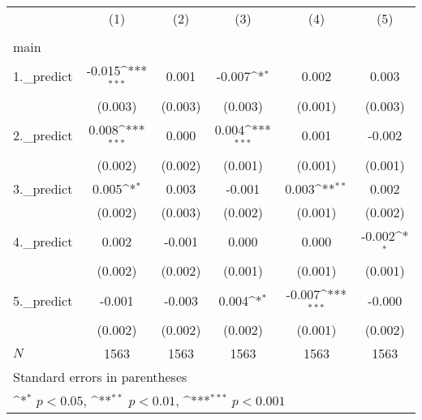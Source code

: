 {
\def\sym#1{\ifmmode^{#1}\else\(^{#1}\)\fi}
\begin{tabular}{l*{5}{c}}
\hline\hline
            &\multicolumn{1}{c}{(1)}&\multicolumn{1}{c}{(2)}&\multicolumn{1}{c}{(3)}&\multicolumn{1}{c}{(4)}&\multicolumn{1}{c}{(5)}\\
            &\multicolumn{1}{c}{} &\multicolumn{1}{c}{} &\multicolumn{1}{c}{} &\multicolumn{1}{c}{} &\multicolumn{1}{c}{} \\
\hline
main        &                     &                     &                     &                     &                     \\
1.\_predict  &      -0.015\sym{***}&       0.001         &      -0.007\sym{*}  &       0.002         &       0.003         \\
            &     (0.003)         &     (0.003)         &     (0.003)         &     (0.001)         &     (0.003)         \\
[1em]
2.\_predict  &       0.008\sym{***}&       0.000         &       0.004\sym{***}&       0.001         &      -0.002         \\
            &     (0.002)         &     (0.002)         &     (0.001)         &     (0.001)         &     (0.001)         \\
[1em]
3.\_predict  &       0.005\sym{*}  &       0.003         &      -0.001         &       0.003\sym{**} &       0.002         \\
            &     (0.002)         &     (0.003)         &     (0.002)         &     (0.001)         &     (0.002)         \\
[1em]
4.\_predict  &       0.002         &      -0.001         &       0.000         &       0.000         &      -0.002\sym{*}  \\
            &     (0.002)         &     (0.002)         &     (0.001)         &     (0.001)         &     (0.001)         \\
[1em]
5.\_predict  &      -0.001         &      -0.003         &       0.004\sym{*}  &      -0.007\sym{***}&      -0.000         \\
            &     (0.002)         &     (0.002)         &     (0.002)         &     (0.001)         &     (0.002)         \\
\hline
\(N\)       &        1563         &        1563         &        1563         &        1563         &        1563         \\
\hline\hline
\multicolumn{6}{l}{\footnotesize Standard errors in parentheses}\\
\multicolumn{6}{l}{\footnotesize \sym{*} \(p<0.05\), \sym{**} \(p<0.01\), \sym{***} \(p<0.001\)}\\
\end{tabular}
}
